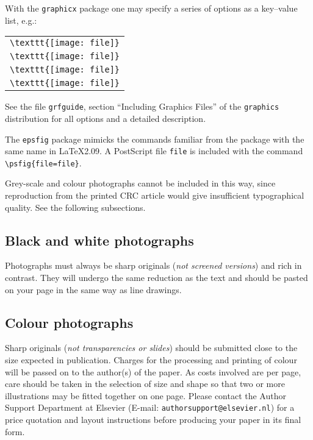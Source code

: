 \documentclass[fleqn,12pt,twoside]{article}
\begin{document}
With the \texttt{graphicx} package one may specify a series of options
as a key--value list, e.g.:
\begin{tabular}{@{}l}
\verb|\texttt{[image: file]}|\\
\verb|\texttt{[image: file]}|\\
\verb|\texttt{[image: file]}|\\
\verb|\texttt{[image: file]}|
\end{tabular}

See the file \texttt{grfguide}, section ``Including Graphics Files''
of the \texttt{graphics} distribution for all options and a detailed
description.

The \texttt{epsfig} package mimicks the commands familiar from the
package with the same name in \LaTeX2.09. A PostScript file
\texttt{file} is included with the command
\newline \verb|\psfig{file=file}|.

Grey-scale and colour photographs cannot be included in this way,
since reproduction from the printed CRC article would give
insufficient typographical quality. See the following subsections.

\subsection{Black and white photographs}

Photographs must always be sharp originals ({\em not screened
versions\/}) and rich in contrast. They will undergo the same reduction
as the text and should be pasted on your page in the same way as line
drawings.

\subsection{Colour photographs}

Sharp originals ({\em not transparencies or slides\/}) should be
submitted close to the size expected in publication. Charges for the
processing and printing of colour will be passed on to the author(s) of
the paper. As costs involved are per page, care should be taken in the
selection of size and shape so that two or more illustrations may be
fitted together on one page. Please contact the Author Support
Department at Elsevier (E-mail: \texttt{authorsupport@elsevier.nl})
for a price quotation and layout instructions before producing your
paper in its final form.
\end{document}
